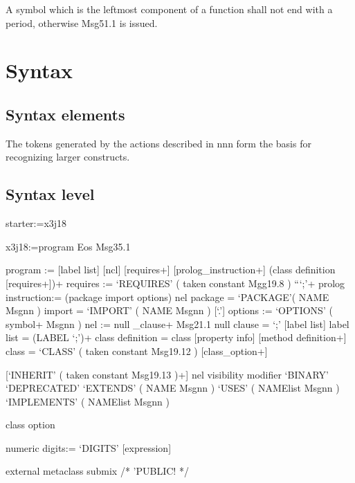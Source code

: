 A symbol which is the leftmost component of a function shall not end
with a period, otherwise Msg51.1 is issued.

\section{Syntax}\label{syntax}

\subsection{Syntax elements}\label{syntax-elements}

The tokens generated by the actions described in nnn form the basis for
recognizing larger constructs.

\subsection{Syntax level}\label{syntax-level}

starter:=x3j18

x3j18:=program Eos \textbar{} Msg35.1

program := {[}label list{]} {[}ncl{]} {[}requires+{]}
{[}prolog\_instruction+{]} (class definition {[}requires+{]})+ requires
:= `REQUIRES' ( taken constant \textbar{} Mgg19.8 ) ```;'+ prolog
instruction:= (package \textbar{} import \textbar{} options) nel package
= `PACKAGE'( NAME \textbar{} Msgnn ) import = `IMPORT' ( NAME \textbar{}
Msgnn ) {[}`.'{]} options := `OPTIONS' ( symbol+ \textbar{} Msgnn ) nel
:= null \_clause+ \textbar{} Msg21.1 null clause = `;' {[}label list{]}
label list = (LABEL `;')+ class definition = class {[}property info{]}
{[}method definition+{]} class = `CLASS' ( taken constant \textbar{}
Msg19.12 ) {[}class\_option+{]}

{[}`INHERIT' ( taken constant \textbar{} Msg19.13 )+{]} nel visibility
\textbar{} modifier \textbar{} `BINARY' \textbar{} `DEPRECATED'
`EXTENDS' ( NAME \textbar{} Msgnn ) `USES' ( NAMElist \textbar{} Msgnn )
\textbar{} `IMPLEMENTS' ( NAMElist \textbar{} Msgnn )

class option

numeric digits:= `DIGITS' {[}expression{]}

external \textbar{} metaclass \textbar{} submix /* \textbar{} 'PUBLIC!
*/

